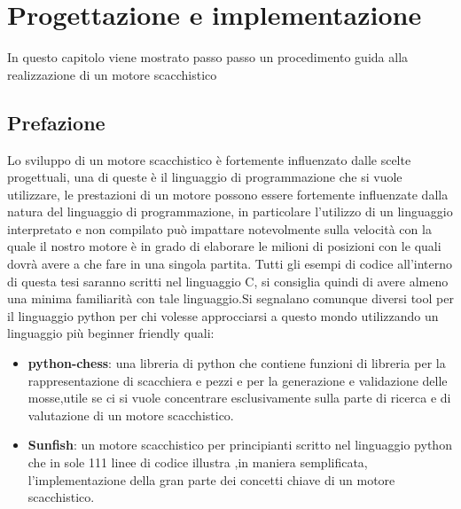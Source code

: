 \chapter{Progettazione e implementazione} %
%

\begin{citazione}
    In questo capitolo viene mostrato passo passo un procedimento guida alla realizzazione di un motore scacchistico
\end{citazione}

\newpage
\section{Prefazione} %
Lo sviluppo di un motore scacchistico è fortemente influenzato dalle scelte progettuali,
una di queste è il linguaggio di programmazione che si vuole utilizzare,
le prestazioni di un motore possono essere fortemente influenzate dalla natura del linguaggio di
programmazione, in particolare l'utilizzo di un linguaggio interpretato e non compilato può impattare
notevolmente sulla velocità con la quale il nostro motore è in grado di elaborare le milioni di
posizioni con le quali dovrà avere a che fare in una singola partita.
Tutti gli esempi di codice all'interno di questa tesi saranno scritti nel linguaggio C, si consiglia
quindi di avere almeno una minima familiarità con tale linguaggio.Si segnalano comunque diversi
tool  per il linguaggio python per chi volesse approcciarsi a questo mondo utilizzando un
linguaggio più beginner friendly  quali:
\begin{itemize}
    \item \textbf{python-chess}: una libreria di python che contiene funzioni di libreria per la rappresentazione
          di scacchiera e pezzi e per la generazione e validazione delle mosse,utile se ci si vuole concentrare
          esclusivamente sulla parte di ricerca e di valutazione  di un motore scacchistico.
    \item \textbf{Sunfish}: un motore scacchistico per principianti scritto nel linguaggio python che
          in sole 111 linee di codice illustra ,in maniera semplificata, l'implementazione della
          gran parte dei concetti  chiave di un motore scacchistico.

\end{itemize}



